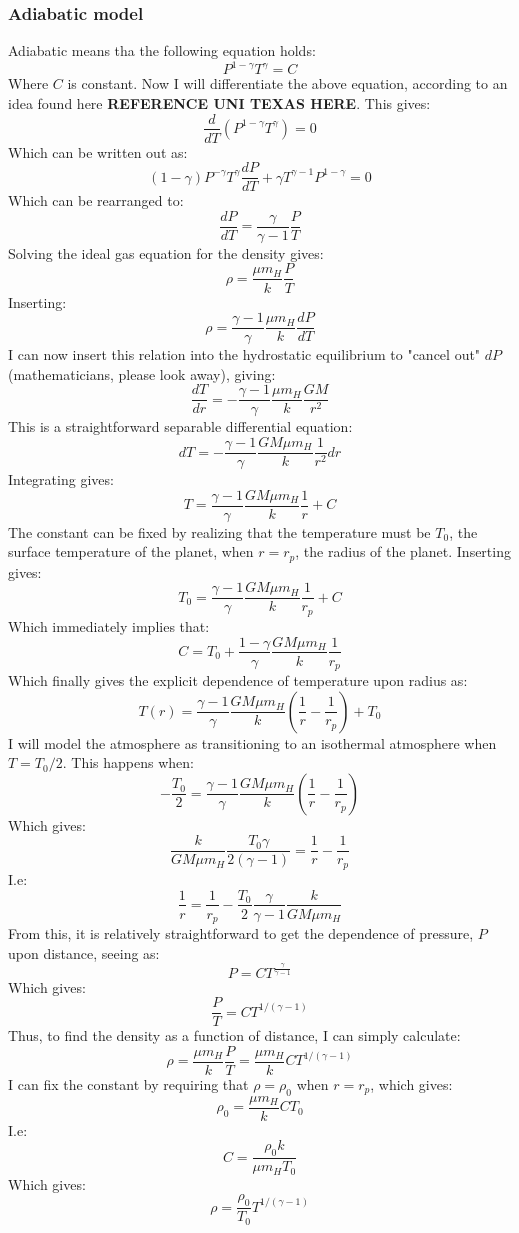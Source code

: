 \documentclass[a4paper,10pt,english]{article}
\begin{document}
\subsubsection{Adiabatic model}
Adiabatic means tha the following equation holds:
\begin{equation}
P^{1-\gamma}T^\gamma=C
\end{equation}
Where $C$ is constant. Now I will differentiate the above equation, according to an idea found here \textbf{REFERENCE UNI TEXAS HERE}. This gives:
$$\frac{d}{dT}\left(P^{1-\gamma}T^{\gamma}\right)=0$$
Which can be written out as:
$$(1-\gamma)P^{-\gamma}T^{\gamma}\frac{dP}{dT}+\gamma T^{\gamma-1}P^{1-\gamma}=0$$
Which can be rearranged to:
$$\frac{dP}{dT}=\frac{\gamma}{\gamma-1}\frac{P}{T}$$
Solving the ideal gas equation for the density gives:
$$\rho=\frac{\mu m_H}{k}\frac{P}{T}$$
Inserting:
$$\rho=\frac{\gamma-1}{\gamma}\frac{\mu m_H}{k}\frac{dP}{dT}$$
I can now insert this relation into the hydrostatic equilibrium to "cancel out" $dP$ (mathematicians, please look away), giving:
$$\frac{dT}{dr}=-\frac{\gamma-1}{\gamma}\frac{\mu m_H}{k}\frac{GM}{r^2}$$
This is a straightforward separable differential equation:
$$ dT = -\frac{\gamma-1}{\gamma}\frac{GM\mu m_H}{k}\frac{1}{r^2} dr$$
Integrating gives:
$$T=\frac{\gamma-1}{\gamma}\frac{GM\mu m_H}{k}\frac{1}{r}+C$$
The constant can be fixed by realizing that the temperature must be $T_0$, the surface temperature of the planet, when $r=r_p$, the radius of the planet. Inserting gives:
$$T_0=\frac{\gamma-1}{\gamma}\frac{GM\mu m_H}{k}\frac{1}{r_p}+C$$
Which immediately implies that:
$$C=T_0+\frac{1-\gamma}{\gamma}\frac{GM\mu m_H}{k}\frac{1}{r_p}$$
Which finally gives the explicit dependence of temperature upon radius as:
$$T(r)=\frac{\gamma-1}{\gamma}\frac{GM\mu m_H}{k}\left(\frac{1}{r}-\frac{1}{r_p}\right)+T_0$$
I will model the atmosphere as transitioning to an isothermal atmosphere when $T=T_0/2$. This happens when:
$$-\frac{T_0}{2}=\frac{\gamma-1}{\gamma}\frac{GM\mu m_H}{k}\left(\frac{1}{r}-\frac{1}{r_p}\right)$$
Which gives:
$$\frac{k}{GM\mu m_H}\frac{T_0\gamma}{2(\gamma-1)}=\frac{1}{r}-\frac{1}{r_p}$$
I.e:
$$\frac{1}{r}=\frac{1}{r_p}-\frac{T_0}{2}\frac{\gamma}{\gamma-1}\frac{k}{GM\mu m_H}$$
From this, it is relatively straightforward to get the dependence of pressure, $P$ upon distance, seeing as:
$$P=CT^{\frac{\gamma}{\gamma-1}}$$
Which gives:
$$\frac{P}{T}=CT^{1/(\gamma-1)}$$
Thus, to find the density as a function of distance, I can simply calculate:
$$\rho=\frac{\mu m_H}{k}\frac{P}{T}=\frac{\mu m_H}{k}CT^{1/(\gamma-1)}$$
I can fix the constant by requiring that $\rho=\rho_0$ when $r=r_p$, which gives:
$$\rho_0=\frac{\mu m_H}{k}CT_0$$
I.e:
$$C=\frac{\rho_0 k}{\mu m_H T_0}$$
Which gives:
$$\rho=\frac{\rho_0}{T_0}T^{1/(\gamma-1)}$$
\end{document}
